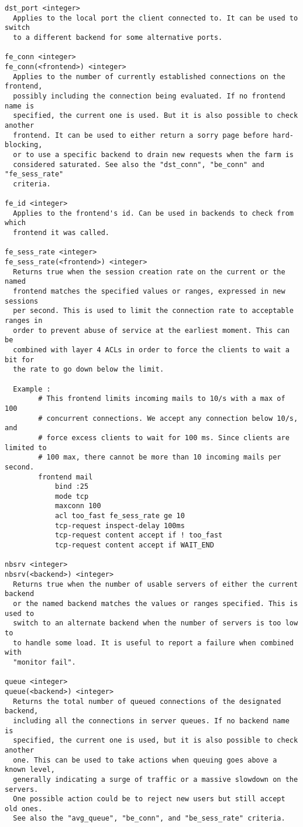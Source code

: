 \begin{verbatim}
dst_port <integer>
  Applies to the local port the client connected to. It can be used to switch
  to a different backend for some alternative ports.

fe_conn <integer>
fe_conn(<frontend>) <integer>
  Applies to the number of currently established connections on the frontend,
  possibly including the connection being evaluated. If no frontend name is
  specified, the current one is used. But it is also possible to check another
  frontend. It can be used to either return a sorry page before hard-blocking,
  or to use a specific backend to drain new requests when the farm is
  considered saturated. See also the "dst_conn", "be_conn" and "fe_sess_rate"
  criteria.

fe_id <integer>
  Applies to the frontend's id. Can be used in backends to check from which
  frontend it was called.

fe_sess_rate <integer>
fe_sess_rate(<frontend>) <integer>
  Returns true when the session creation rate on the current or the named
  frontend matches the specified values or ranges, expressed in new sessions
  per second. This is used to limit the connection rate to acceptable ranges in
  order to prevent abuse of service at the earliest moment. This can be
  combined with layer 4 ACLs in order to force the clients to wait a bit for
  the rate to go down below the limit.

  Example :
        # This frontend limits incoming mails to 10/s with a max of 100
        # concurrent connections. We accept any connection below 10/s, and
        # force excess clients to wait for 100 ms. Since clients are limited to
        # 100 max, there cannot be more than 10 incoming mails per second.
        frontend mail
            bind :25
            mode tcp
            maxconn 100
            acl too_fast fe_sess_rate ge 10
            tcp-request inspect-delay 100ms
            tcp-request content accept if ! too_fast
            tcp-request content accept if WAIT_END

nbsrv <integer>
nbsrv(<backend>) <integer>
  Returns true when the number of usable servers of either the current backend
  or the named backend matches the values or ranges specified. This is used to
  switch to an alternate backend when the number of servers is too low to
  to handle some load. It is useful to report a failure when combined with
  "monitor fail".

queue <integer>
queue(<backend>) <integer>
  Returns the total number of queued connections of the designated backend,
  including all the connections in server queues. If no backend name is
  specified, the current one is used, but it is also possible to check another
  one. This can be used to take actions when queuing goes above a known level,
  generally indicating a surge of traffic or a massive slowdown on the servers.
  One possible action could be to reject new users but still accept old ones.
  See also the "avg_queue", "be_conn", and "be_sess_rate" criteria.


\end{verbatim}
